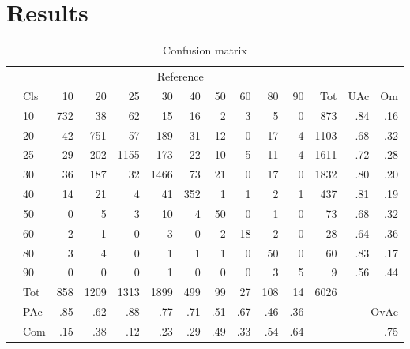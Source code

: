\section{Results}
\label{sec:result}

\begin{table}
	\centering
	\caption[Sampling count]{Confusion matrix}
	\label{tab:rt1}
	\begin{tabular}{ll|rrrrrrrrr|rrr}
		& & \multicolumn{9}{c|}{Reference} & & & \\
		& Cls & 10 & 20 & 25 & 30 & 40 & 50 & 60 & 80 & 90 & Tot & UAc & Om \\\hline
		\multirow{9}{*}{\STAB{\rotatebox[origin=c]{90}{Prediction}}}
		& 10 & 732 & 38 & 62 & 15 & 16 & 2 & 3 & 5 & 0 & 873 & .84 & .16 \\ 
		& 20 & 42 & 751 & 57 & 189 & 31 & 12 & 0 & 17 & 4 & 1103 & .68 & .32 \\ 
		& 25 & 29 & 202 & 1155 & 173 & 22 & 10 & 5 & 11 & 4 & 1611 & .72 & .28 \\ 
		& 30 & 36 & 187 & 32 & 1466 & 73 & 21 & 0 & 17 & 0 & 1832 & .80 & .20 \\ 
		& 40 & 14 & 21 & 4 & 41 & 352 & 1 & 1 & 2 & 1 & 437 & .81 & .19 \\ 
		& 50 & 0 & 5 & 3 & 10 & 4 & 50 & 0 & 1 & 0 & 73 & .68 & .32 \\ 
		& 60 & 2 & 1 & 0 & 3 & 0 & 2 & 18 & 2 & 0 & 28 & .64 & .36 \\ 
		& 80 & 3 & 4 & 0 & 1 & 1 & 1 & 0 & 50 & 0 & 60 & .83 & .17 \\ 
		& 90 & 0 & 0 & 0 & 1 & 0 & 0 & 0 & 3 & 5 & 9 & .56 & .44 \\\hline 
		& Tot & 858 & 1209 & 1313 & 1899 & 499 & 99 & 27 & 108 & 14 & 6026 & & \\
		& PAc & .85 & .62 & .88 & .77 & .71 & .51 & .67 & .46 & .36 & & \multicolumn{2}{r}{OvAc} \\
		& Com & .15 & .38 & .12 & .23 & .29 & .49 & .33 & .54 & .64 & &
		\multicolumn{2}{r}{.75} \\ 
	\end{tabular}
\end{table}


